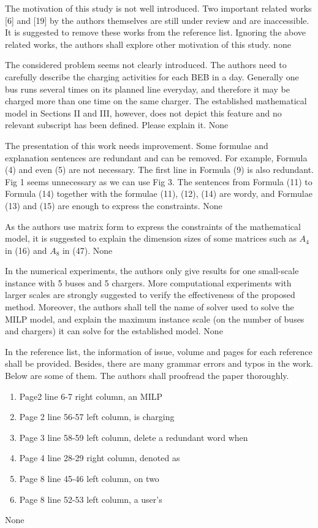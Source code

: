 \documentclass{article}
\begin{document}
\begin{buttkissing}
	\reviewerclaims The motivation of this study is not well introduced. Two important related works [6] and [19] by the authors themselves are still under review and are inaccessible. It is suggested to remove these works from the reference list. Ignoring the above related works, the authors shall explore other motivation of this study.
	\kissbutt none 

	\reviewerclaims The considered problem seems not clearly introduced. The authors need to carefully describe the charging activities for each BEB in a day. Generally one bus runs several times on its planned line everyday, and therefore it may be charged more than one time on the same charger. The established mathematical model in Sections II and III, however, does not depict this feature and no relevant subscript has been defined. Please explain it.
	\kissbutt None

	\reviewerclaims The presentation of this work needs improvement. Some formulae and explanation sentences are redundant and can be removed. For example, Formula (4) and even (5) are not necessary. The first line in Formula (9) is also redundant. Fig 1 seems unnecessary as we can use Fig 3. The sentences from Formula (11) to Formula (14) together with the formulae (11), (12), (14) are wordy, and Formulae (13) and (15) are enough to express the constraints.
	\kissbutt None

	\reviewerclaims As the authors use matrix form to express the constraints of the mathematical model, it is suggested to explain the dimension sizes of some matrices such as $A_4$ in (16) and $A_8$ in (47).
	\kissbutt None

	\reviewerclaims  In the numerical experiments, the authors only give results for one small-scale instance with 5 buses and 5 chargers. More computational experiments with larger scales are strongly suggested to verify the effectiveness of the proposed method. Moreover, the authors shall tell the name of solver used to solve the MILP model, and explain the maximum instance scale (on the number of buses and chargers) it can solve for the established model.
	\kissbutt None

	\reviewerclaims  In the reference list, the information of issue, volume and pages for each reference shall be provided.
	Besides, there are many grammar errors and typos in the work. Below are some of them. The authors shall proofread the paper thoroughly.
	\begin{enumerate}
	    \item Page2 line 6-7 right column, an MILP
	    \item Page 2 line 56-57 left column, is charging
	    \item Page 3 line 58-59 left column, delete a redundant word when
	    \item Page 4 line 28-29 right column, denoted as
	    \item Page 8 line 45-46 left column, on two
	    \item Page 8 line 52-53 left column, a user’s
	\end{enumerate} 
	\kissbutt None 
\end{buttkissing} 
\end{document}

